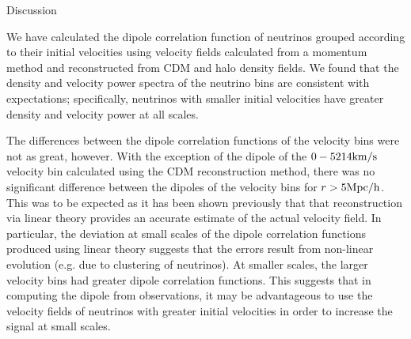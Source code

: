 \begin{section}{Discussion}
  \label{sec:discussion}

  We have calculated the dipole correlation function of neutrinos 
grouped according to their initial velocities using velocity fields
calculated from a momentum method and reconstructed from CDM and halo
density fields. We found that the density and velocity power spectra
of the neutrino bins are consistent with expectations; specifically,
neutrinos with smaller initial velocities have greater density and
velocity power at all scales.
 
\par The differences between the dipole correlation functions 
of the velocity bins were not as great, however. With the 
exception of the dipole of the $0-5214{\rm km}/{\rm s}$ velocity bin 
calculated using the CDM reconstruction method, there was no significant 
difference between the dipoles of the velocity bins for $r>5\mbox{Mpc}/\mbox{h}$. 
This was to be expected as it has been shown previously that 
\cite{bib:Inman} that reconstruction via linear theory provides an 
accurate estimate of the actual velocity field. In particular, the 
deviation at small scales of the dipole correlation functions produced
using linear theory suggests that the errors result from non-linear
evolution (e.g. due to clustering of neutrinos). At smaller scales, 
the larger velocity bins had greater dipole correlation functions. 
This suggests that in computing the dipole from observations, it 
may be advantageous to use the velocity fields of neutrinos with 
greater initial velocities in order to increase the signal at small 
scales.  
 
\end{section}
